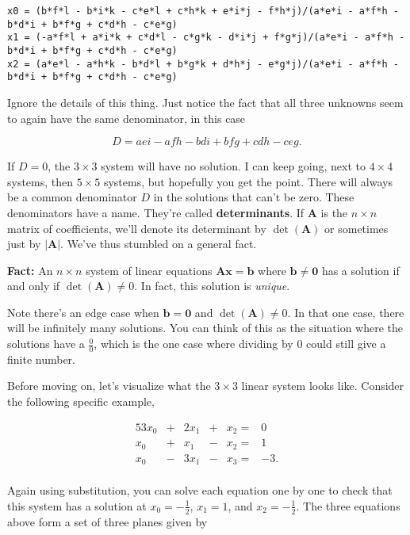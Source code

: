 \documentclass[
  letterpaper,
  DIV=11,
  numbers=noendperiod]{scrreprt}
\begin{document}
\begin{verbatim}
x0 = (b*f*l - b*i*k - c*e*l + c*h*k + e*i*j - f*h*j)/(a*e*i - a*f*h - b*d*i + b*f*g + c*d*h - c*e*g)
x1 = (-a*f*l + a*i*k + c*d*l - c*g*k - d*i*j + f*g*j)/(a*e*i - a*f*h - b*d*i + b*f*g + c*d*h - c*e*g)
x2 = (a*e*l - a*h*k - b*d*l + b*g*k + d*h*j - e*g*j)/(a*e*i - a*f*h - b*d*i + b*f*g + c*d*h - c*e*g)
\end{verbatim}

Ignore the details of this thing. Just notice the fact that all three
unknowns seem to again have the same denominator, in this case

\[D = aei - afh - bdi + bfg + cdh - ceg.\]

If \(D=0\), the \(3 \times 3\) system will have no solution. I can keep
going, next to \(4 \times 4\) systems, then \(5 \times 5\) systems, but
hopefully you get the point. There will always be a common denominator
\(D\) in the solutions that can't be zero. These denominators have a
name. They're called \textbf{determinants}. If \(\mathbf{A}\) is the
\(n \times n\) matrix of coefficients, we'll denote its determinant by
\(\det(\mathbf{A})\) or sometimes just by \(|\mathbf{A}|\). We've thus
stumbled on a general fact.

\textbf{Fact:} An \(n \times n\) system of linear equations
\(\mathbf{Ax}=\mathbf{b}\) where \(\mathbf{b} \neq \mathbf{0}\) has a
solution if and only if \(\det(\mathbf{A}) \neq 0\). In fact, this
solution is \emph{unique}.

Note there's an edge case when \(\mathbf{b} = \mathbf{0}\) and
\(\det(\mathbf{A}) \neq 0\). In that one case, there will be infinitely
many solutions. You can think of this as the situation where the
solutions have a \(\frac{0}{0}\), which is the one case where dividing
by \(0\) could still give a finite number.

Before moving on, let's visualize what the \(3 \times 3\) linear system
looks like. Consider the following specific example,

\begin{alignat*}{5}
   3x_0 & {}+{} &  2x_1 & {}+{} & x_2 {}={} & 0 \\
   x_0 & {}+{} &  x_1 & {}-{} & x_2 {}={} & 1 \\
   x_0 & {}-{} &  3x_1 & {}-{} & x_3 {}={} & -3. \\
\end{alignat*}

Again using substitution, you can solve each equation one by one to
check that this system has a solution at \(x_0=-\frac{1}{2}\),
\(x_1=1\), and \(x_2=-\frac{1}{2}\). The three equations above form a
set of three planes given by
\end{document}
